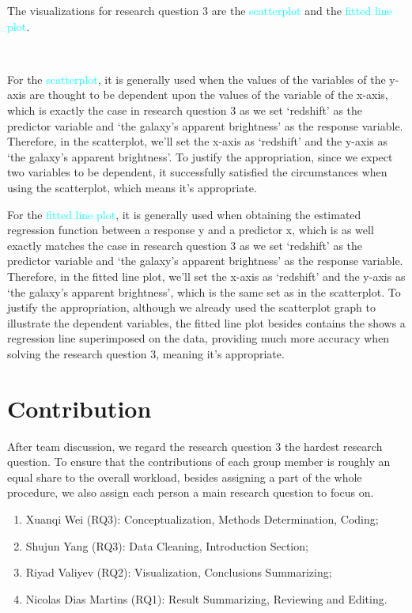 \documentclass[12pt]{article}
\begin{document}
The visualizations for research question 3 are the \textcolor{cyan}{scatterplot} and the \textcolor{cyan}{fitted line plot}.

\

\noindent For the \textcolor{cyan}{scatterplot}, it is generally used when the values of the variables of the y-axis are thought to be dependent upon the values of the variable of the x-axis, which is exactly the case in research question 3 as we set `redshift' as the predictor variable and `the galaxy's apparent brightness' as the response variable. Therefore, in the scatterplot, we'll set the x-axis as `redshift' and the y-axis as `the galaxy's apparent brightness'. To justify the appropriation, since we expect two variables to be dependent, it successfully satisfied the circumstances when using the scatterplot, which means it's appropriate.

\noindent For the \textcolor{cyan}{fitted line plot}, it is generally used when obtaining the estimated regression function between a response y and a predictor x, which is as well exactly matches the case in research question 3 as we set `redshift' as the predictor variable and `the galaxy's apparent brightness' as the response variable. Therefore, in the fitted line plot, we'll set the x-axis as `redshift' and the y-axis as `the galaxy's apparent brightness', which is the same set as in the scatterplot. To justify the appropriation, although we already used the scatterplot graph to illustrate the dependent variables, the fitted line plot besides contains the shows a regression line superimposed on the data, providing much more accuracy when solving the research question 3, meaning it's appropriate. 


\newpage

\section{Contribution}
After team discussion, we regard the research question 3 the hardest research question. To ensure that the contributions of each group member is roughly an equal share to the overall workload, besides assigning a part of the whole procedure, we also assign each person a main research question to focus on. 

\begin{enumerate}
	\item Xuanqi Wei (RQ3): Conceptualization, Methods Determination, Coding;
	\item Shujun Yang (RQ3): Data Cleaning, Introduction Section;
	\item Riyad Valiyev (RQ2): Visualization, Conclusions Summarizing;
	\item Nicolas Dias Martins (RQ1): Result Summarizing, Reviewing and Editing.
\end{enumerate}
\end{document}
